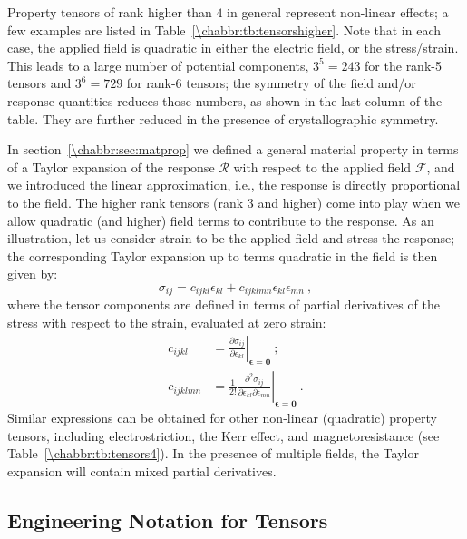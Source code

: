 Property tensors of rank higher than $4$ in general represent non-linear effects; a few examples are listed in Table~\ref{\chabbr:tb:tensorshigher}. Note that in each case, the applied field is quadratic in either the electric field, or the stress/strain.  This leads to a large number of potential components, $3^5=243$ for the rank-5 tensors and $3^6=729$ for rank-6 tensors; the symmetry of the field and/or response quantities reduces those numbers, as shown in the last column of the table.  They are further reduced in the presence of crystallographic symmetry.  

In section~\ref{\chabbr:sec:matprop} we defined a general material property in terms of a Taylor expansion of the response $\mathcal{R}$ with respect to the applied field $\mathcal{F}$, and we introduced the linear approximation, i.e., the response is directly proportional to the field.  The higher rank tensors (rank $3$ and higher) come into play when we allow quadratic (and higher) field terms to contribute to the response.  As an illustration, let us consider strain to be the applied field and stress the response; the corresponding Taylor expansion up to terms quadratic in the field is then given by:
\begin{equation}
	\sigma_{ij} = c_{ijkl}\epsilon_{kl} + c_{ijklmn}\epsilon_{kl}\epsilon_{mn}\ ,
\end{equation}
where the tensor components are defined in terms of partial derivatives of the stress with respect to the strain, evaluated at zero strain:
\begin{equation*}
\begin{split}
	c_{ijkl} &= \left.\frac{\partial\sigma_{ij}}{\partial\epsilon_{kl}}\right \vert_{\bm{\epsilon}=\bm{0}}\ ;\\ 
	c_{ijklmn} &= \frac{1}{2!}\left.\frac{\partial^2\sigma_{ij}}{\partial\epsilon_{kl}\partial\epsilon_{mn}}\right \vert_{\bm{\epsilon}=\bm{0}}\ . 	
\end{split}
\end{equation*}
Similar expressions can be obtained for other non-linear (quadratic) property tensors, including electrostriction, the Kerr effect, and magnetoresistance (see Table~\ref{\chabbr:tb:tensors4}).  In the presence of multiple fields, the Taylor expansion will contain mixed partial derivatives.


\subsection{Engineering Notation for Tensors}\label{\chabbr:ssec:engnot}


